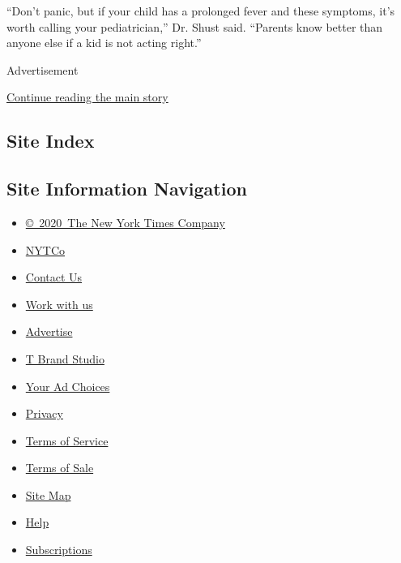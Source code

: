 ``Don't panic, but if your child has a prolonged fever and these
symptoms, it's worth calling your pediatrician,'' Dr. Shust said.
``Parents know better than anyone else if a kid is not acting right.''

Advertisement

\protect\hyperlink{after-bottom}{Continue reading the main story}

\hypertarget{site-index}{%
\subsection{Site Index}\label{site-index}}

\hypertarget{site-information-navigation}{%
\subsection{Site Information
Navigation}\label{site-information-navigation}}

\begin{itemize}
\tightlist
\item
  \href{https://help.nytimes.com/hc/en-us/articles/115014792127-Copyright-notice}{©~2020~The
  New York Times Company}
\end{itemize}

\begin{itemize}
\tightlist
\item
  \href{https://www.nytco.com/}{NYTCo}
\item
  \href{https://help.nytimes.com/hc/en-us/articles/115015385887-Contact-Us}{Contact
  Us}
\item
  \href{https://www.nytco.com/careers/}{Work with us}
\item
  \href{https://nytmediakit.com/}{Advertise}
\item
  \href{http://www.tbrandstudio.com/}{T Brand Studio}
\item
  \href{https://www.nytimes.com/privacy/cookie-policy\#how-do-i-manage-trackers}{Your
  Ad Choices}
\item
  \href{https://www.nytimes.com/privacy}{Privacy}
\item
  \href{https://help.nytimes.com/hc/en-us/articles/115014893428-Terms-of-service}{Terms
  of Service}
\item
  \href{https://help.nytimes.com/hc/en-us/articles/115014893968-Terms-of-sale}{Terms
  of Sale}
\item
  \href{https://spiderbites.nytimes.com}{Site Map}
\item
  \href{https://help.nytimes.com/hc/en-us}{Help}
\item
  \href{https://www.nytimes.com/subscription?campaignId=37WXW}{Subscriptions}
\end{itemize}
